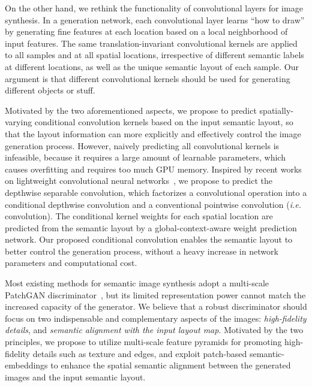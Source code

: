 \documentclass{article}
\newcommand{\ie}{\textit{i.e.}}
\begin{document}
On the other hand, we rethink the functionality of convolutional layers for image synthesis. 
In a generation network, each convolutional layer learns ``how to draw'' by generating fine features at each location based on a local neighborhood of input features.
The same translation-invariant convolutional kernels are applied to all samples and at all spatial locations, irrespective of different semantic labels at different locations, as well as the unique semantic layout of each sample.
Our argument is that different convolutional kernels should be used for generating different objects or stuff.




Motivated by the two aforementioned aspects, we propose to predict spatially-varying conditional convolution kernels based on the input semantic layout, so that the layout information can more explicitly and effectively control the image generation process.
However, naively predicting all convolutional kernels is infeasible, because it requires a large amount of learnable parameters, which causes overfitting and requires too much GPU memory.
Inspired by recent works on lightweight convolutional neural networks~\cite{chollet2017xception,howard2017mobilenets,ma2018shufflenet}, we propose to predict the depthwise separable convolution, which factorizes a convolutional operation into a conditional depthwise convolution and a conventional pointwise convolution (\ie~ convolution). 
The conditional kernel weights for each spatial location are predicted from the semantic layout by a global-context-aware weight prediction network.
Our proposed conditional convolution enables the semantic layout to better control the generation process, without a heavy increase in network parameters and computational cost.


Most existing methods for semantic image synthesis adopt a multi-scale PatchGAN discriminator~\cite{wang2018high,park2019semantic}, but its limited representation power cannot match the increased capacity of the generator.
We believe that a robust discriminator should focus on two indispensable and complementary aspects of the images: \textit{high-fidelity details}, and \textit{semantic alignment with the input layout map}.
Motivated by the two principles, we propose to utilize multi-scale feature pyramids for promoting high-fidelity details such as texture and edges, and exploit patch-based semantic-embeddings to enhance the spatial semantic alignment between the generated images and the input semantic layout.
\end{document}
